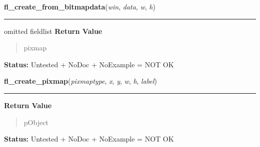     \label{xformslib:library:fl_create_from_bitmapdata}

    \vspace{0.5ex}

\hspace{.8\funcindent}\begin{boxedminipage}{\funcwidth}

    \raggedright \textbf{fl\_create\_from\_bitmapdata}(\textit{win}, \textit{data}, \textit{w}, \textit{h})

    \vspace{-1.5ex}

    \rule{\textwidth}{0.5\fboxrule}
\setlength{\parskip}{2ex}
    {omitted fieldlist}
\setlength{\parskip}{1ex}
      \textbf{Return Value}
    \vspace{-1ex}

      \begin{quote}
      pixmap

      \end{quote}

\textbf{Status:} Untested + NoDoc + NoExample = NOT OK



    \end{boxedminipage}

    \label{xformslib:library:fl_create_pixmap}

    \vspace{0.5ex}

\hspace{.8\funcindent}\begin{boxedminipage}{\funcwidth}

    \raggedright \textbf{fl\_create\_pixmap}(\textit{pixmaptype}, \textit{x}, \textit{y}, \textit{w}, \textit{h}, \textit{label})

    \vspace{-1.5ex}

    \rule{\textwidth}{0.5\fboxrule}
\setlength{\parskip}{2ex}
\setlength{\parskip}{1ex}
      \textbf{Return Value}
    \vspace{-1ex}

      \begin{quote}
      pObject

      \end{quote}

\textbf{Status:} Untested + NoDoc + NoExample = NOT OK



    \end{boxedminipage}

